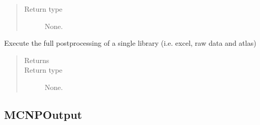 \documentclass[letterpaper,10pt,english]{sphinxmanual}
\begin{document}
\begin{fulllineitems}
\begin{fulllineitems}
\begin{quote}
\begin{description}
\item[{Return type}] \leavevmode
None.

\end{description}\end{quote}

\end{fulllineitems}


\begin{fulllineitems}
\label{\detokenize{api/postprocessing:output.BenchmarkOutput.single_postprocess}}
Execute the full post\sphinxhyphen{}processing of a single library (i.e. excel,
raw data and atlas)
\begin{quote}\begin{description}
\item[{Returns}] \leavevmode


\item[{Return type}] \leavevmode
None.

\end{description}\end{quote}

\end{fulllineitems}


\end{fulllineitems}



\subsection{MCNPOutput}
\label{\detokenize{api/postprocessing:mcnpoutput}}\label{\detokenize{api/postprocessing:mcnpoutputob}}
\end{document}
